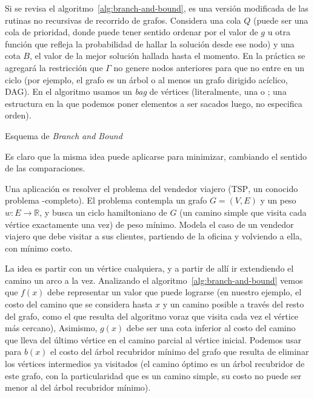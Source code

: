   Si se revisa el algoritmo~\ref{alg:branch-and-bound},
  es una versión modificada de las rutinas no recursivas
  de recorrido de grafos.
  Considera una cola \(Q\)
  (puede ser una cola de prioridad,
   donde puede tener sentido ordenar por el valor de \(g\)
   u otra función que refleja la probabilidad
   de hallar la solución desde ese nodo)
  y una cota \(B\),
  el valor de la mejor solución hallada hasta el momento.
  En la práctica se agregará la restricción
  que \(\Gamma\) no genere nodos anteriores
  para que no entre en un ciclo
  (por ejemplo,
   el grafo es un árbol o al menos un grafo dirigido acíclico,
   DAG).
   En el algoritmo usamos un \emph{\foreignlanguage{english}{bag}}
   de vértices
   (literalmente,
    una  o ;
    una estructura en la que podemos poner elementos
    a ser sacados luego,
    no especifica orden).
  \begin{algorithm}
    \DontPrintSemicolon\Indp

    \caption{Esquema de \emph{Branch and Bound}}
    \label{alg:branch-and-bound}
  \end{algorithm}
  Es claro que la misma idea puede aplicarse para minimizar,
  cambiando el sentido de las comparaciones.
  
  Una aplicación es resolver el problema del vendedor viajero
  (\textsc{TSP},
   un conocido problema \NP\nobreakdash-completo).
  El problema contempla un grafo \(G = (V, E)\)
  y un peso \(w \colon E \to \mathbb{R}\),
  y busca un ciclo hamiltoniano de \(G\)
  (un camino simple que visita cada vértice exactamente una vez)
  de peso mínimo.
  Modela el caso de un vendedor viajero que debe visitar a sus clientes,
  partiendo de la oficina y volviendo a ella,
  con mínimo costo.

  La idea es partir con un vértice cualquiera,
  y a partir de allí ir extendiendo el camino un arco a la vez.
  Analizando el algoritmo~\ref{alg:branch-and-bound}
  vemos que \(f(x)\) debe representar un valor que puede lograrse
  (en nuestro ejemplo,
   el costo del camino que se considera hasta \(x\)
   y un camino posible a través del resto del grafo,
   como el que resulta del algoritmo voraz
   que visita cada vez el vértice más cercano),
  Asimismo,
  \(g(x)\) debe ser una cota inferior al costo del camino
  que lleva del último vértice en el camino parcial al vértice inicial.
  Podemos usar para \(b(x)\) el costo del árbol recubridor mínimo
  del grafo que resulta de eliminar los vértices intermedios ya visitados
  (el camino óptimo es un árbol recubridor de este grafo,
   con la particularidad que es un camino simple,
   su costo no puede ser menor al del árbol recubridor mínimo).

